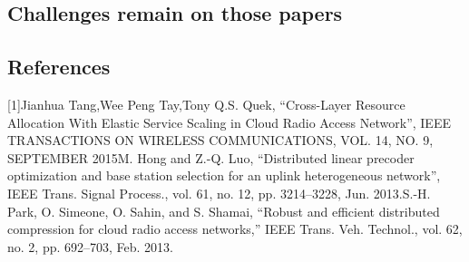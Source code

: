 \documentclass[paper=a4paper,12pt]{article}
\begin{document}
\subsection{Challenges remain on those papers}
\subsection{References}
[1]\quad Jianhua Tang,Wee Peng Tay,Tony Q.S. Quek, ``Cross-Layer Resource Allocation With Elastic Service Scaling in Cloud Radio Access Network'', IEEE TRANSACTIONS ON WIRELESS COMMUNICATIONS, VOL. 14, NO. 9, SEPTEMBER 2015\newline
[2]\quad M. Hong and Z.-Q. Luo, ``Distributed linear precoder optimization and base station selection for an uplink heterogeneous network'', IEEE Trans. Signal Process., vol. 61, no. 12, pp. 3214–3228, Jun. 2013.\newline
[3]\quad S.-H. Park, O. Simeone, O. Sahin, and S. Shamai, ``Robust and efficient
distributed compression for cloud radio access networks,'' IEEE Trans.
Veh. Technol., vol. 62, no. 2, pp. 692–703, Feb. 2013.
\end{document}
